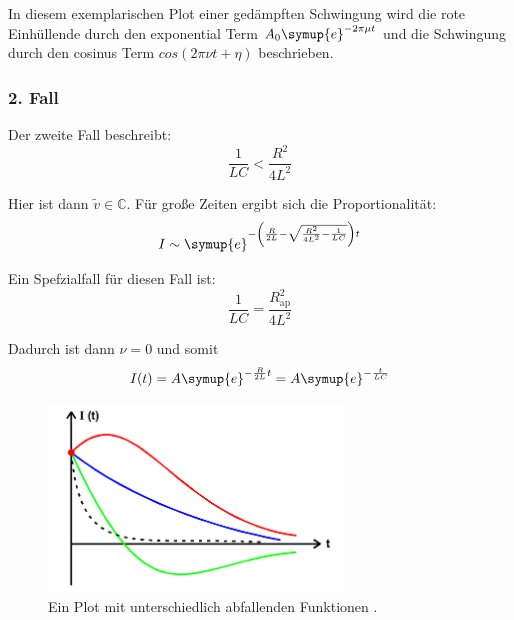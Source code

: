         \noindent In diesem exemplarischen Plot einer gedämpften Schwingung wird die rote Einhüllende durch den 
        exponential Term $A_0 \symup{e}^{- 2 \pi \mu t}$ und die Schwingung durch den cosinus Term $cos(2\pi \nu t + \eta)$ beschrieben.


        \subsubsection{2. Fall}


        \noindent Der zweite Fall beschreibt:
        \begin{equation}
            \frac{1}{LC} < \frac{R^2}{4L^2} \nonumber
        \end{equation}

        \noindent Hier ist dann $\tilde{v} \in \mathds{C}$.
        Für große Zeiten ergibt sich die Proportionalität:
        \begin{equation}   
            I \sim \symup{e}^{- \left( \frac{R}{2L} - \sqrt{\frac{R^2}{4L^2} - \frac{1}{LC}}\right) t} \nonumber
        \end{equation}

        \noindent Ein Spefzialfall für diesen Fall ist:
        \begin{equation}
            \frac{1}{LC} = \frac{R^2_{\text{ap}}}{4L^2} \nonumber
        \end{equation}
        
        \noindent Dadurch ist dann $\nu = 0$ und somit
        \begin{equation}
            I(t) = A \symup{e}^{-\frac{R}{2L}t} = A \symup{e}^{-\frac{t}{LC}} \nonumber
        \end{equation}

        \begin{figure}[H]
            \centering
            \includegraphics[width=0.7\textwidth]{images/AperiodischD.PNG}
            \caption{Ein Plot mit unterschiedlich abfallenden Funktionen \protect \cite{V354}.}
            \label{img:aperi}
        \end{figure}

